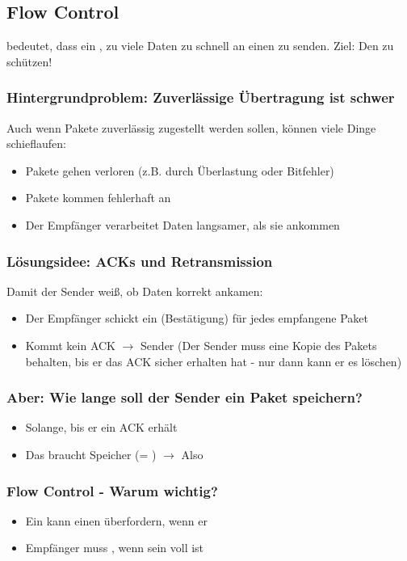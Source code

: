\subsection{Flow Control}
 bedeutet, dass ein , zu viele Daten zu schnell an einen  zu senden. Ziel: Den  zu schützen!
\subsubsection*{Hintergrundproblem: Zuverlässige Übertragung ist schwer}
Auch wenn Pakete zuverlässig zugestellt werden sollen, können viele Dinge schieflaufen:
\begin{itemize}
    \item Pakete gehen verloren (z.B. durch Überlastung oder Bitfehler)
    \item Pakete kommen fehlerhaft an
    \item Der Empfänger verarbeitet Daten langsamer, als sie ankommen
\end{itemize}
\subsubsection*{Lösungsidee: ACKs und Retransmission}
Damit der Sender weiß, ob Daten korrekt ankamen:
\begin{itemize}
    \item Der Empfänger schickt ein  (Bestätigung) für jedes empfangene Paket
    \item Kommt kein ACK $\rightarrow$ Sender  (Der Sender muss eine Kopie des Pakets behalten, bis er das ACK sicher erhalten hat - nur dann kann er es löschen)
\end{itemize}
\subsubsection*{Aber: Wie lange soll der Sender ein Paket speichern?}
\begin{itemize}
    \item Solange, bis er ein ACK erhält
    \item Das braucht Speicher (= ) $\rightarrow$ Also 
\end{itemize}
\subsubsection*{Flow Control - Warum wichtig?}
\begin{itemize}
    \item {} Ein  kann einen  überfordern, wenn er 
    \item {} Empfänger muss , wenn sein  voll ist
\end{itemize} 

